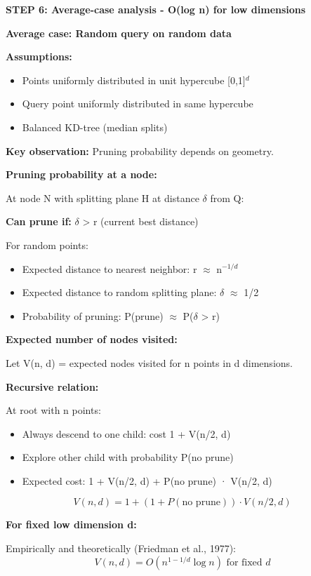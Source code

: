 \documentclass[12pt]{article}
\begin{document}
\begin{solution}
\textbf{STEP 6: Average-case analysis - O(log n) for low dimensions}

\textbf{Average case: Random query on random data}

\textbf{Assumptions:}
\begin{itemize}
    \item Points uniformly distributed in unit hypercube [0,1]$^d$
    \item Query point uniformly distributed in same hypercube
    \item Balanced KD-tree (median splits)
\end{itemize}

\textbf{Key observation:} Pruning probability depends on geometry.

\textbf{Pruning probability at a node:}

At node N with splitting plane H at distance $\delta$ from Q:

\textbf{Can prune if:} $\delta$ > r (current best distance)

For random points:
\begin{itemize}
    \item Expected distance to nearest neighbor: r $\approx$ n$^{-1/d}$
    \item Expected distance to random splitting plane: $\delta$ $\approx$ 1/2
    \item Probability of pruning: P(prune) $\approx$ P($\delta$ > r)
\end{itemize}

\textbf{Expected number of nodes visited:}

Let V(n, d) = expected nodes visited for n points in d dimensions.

\textbf{Recursive relation:}

At root with n points:
\begin{itemize}
    \item Always descend to one child: cost 1 + V(n/2, d)
    \item Explore other child with probability P(no prune)
    \item Expected cost: 1 + V(n/2, d) + P(no prune) · V(n/2, d)
\end{itemize}

\[
V(n, d) = 1 + (1 + P(\text{no prune})) \cdot V(n/2, d)
\]

\textbf{For fixed low dimension d:}

Empirically and theoretically (Friedman et al., 1977):
\[
V(n, d) = O(n^{1-1/d} \log n) \text{ for fixed } d
\]


\end{solution}
\end{document}
